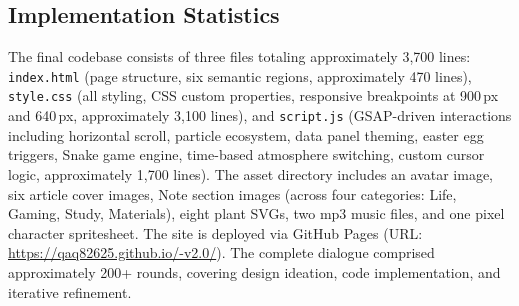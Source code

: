 \subsection{Implementation Statistics}

The final codebase consists of three files totaling approximately 3,700 lines: \texttt{index.html} (page structure, six semantic regions, approximately 470 lines), \texttt{style.css} (all styling, CSS custom properties, responsive breakpoints at 900\,px and 640\,px, approximately 3,100 lines), and \texttt{script.js} (GSAP-driven interactions including horizontal scroll, particle ecosystem, data panel theming, easter egg triggers, Snake game engine, time-based atmosphere switching, custom cursor logic, approximately 1,700 lines).
The asset directory includes an avatar image, six article cover images, Note section images (across four categories: Life, Gaming, Study, Materials), eight plant SVGs, two mp3 music files, and one pixel character spritesheet.
The site is deployed via GitHub Pages (URL: \url{https://qaq82625.github.io/-v2.0/}).
The complete dialogue comprised approximately 200+ rounds, covering design ideation, code implementation, and iterative refinement.
